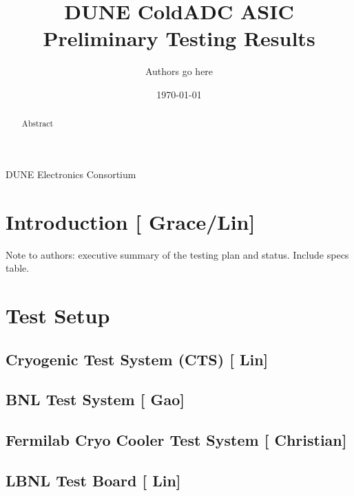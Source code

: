 \documentclass[10pt]{article}
\begin{document}

\title{DUNE ColdADC ASIC Preliminary Testing Results}

\date{\today}
\author{Authors go here}
%	
%	

\maketitle

\centerline{DUNE Electronics Consortium}



\begin{abstract}
Abstract
\end{abstract}


\newpage
\tableofcontents

\newpage

\section{Introduction [{\color{red} Grace/Lin}] }
Note to authors: executive summary of the testing plan and status. Include specs table.




\section{Test Setup}

\subsection{Cryogenic Test System (CTS) [{\color{red} Lin}] }

\subsection{BNL Test System [{\color{red} Gao}] }

\subsection{Fermilab Cryo Cooler Test System [{\color{red} Christian}] }

\subsection{LBNL Test Board  [{\color{red} Lin}] }

\end{document}
